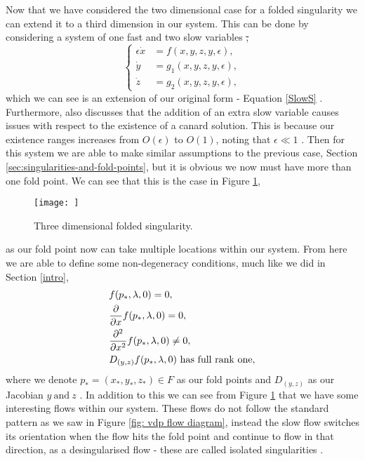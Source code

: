 
Now that we have considered the two dimensional case for a folded singularity we can extend it to a third dimension in our system. This can be done by considering a system of one fast and two slow variables \st, 
\begin{equation}
\begin{cases}
\epsilon \dot{x}&=f(x,y,z,y,\epsilon),\\
\dot{y}&=g_1(x,y,z,y,\epsilon),\\
\dot{z}&=g_2(x,y,z,y,\epsilon),
\end{cases}
\end{equation}
which we can see is an extension of our original form - Equation \ref{SlowS} \citep{MMO}. Furthermore, \citet{MMO} also discusses that the addition of an extra slow variable causes issues with respect to the existence of a canard solution. This is because our existence ranges increases from $ O(\epsilon) $ to $ O(1) $, noting that $ \epsilon\ll 1 $ \citep{MMO}. Then for this system we are able to make similar assumptions to the previous case, Section \ref{sec:singularities-and-fold-points}, but it is obvious we now must have more than one fold point. We can see that this is the case in Figure \ref{fig: 3d folded singularity},
\begin{figure}[h!]\centering
	\texttt{[image: ]}
	\caption{Three dimensional folded singularity.}
	\label{fig: 3d folded singularity}
\end{figure}
as our fold point now can take multiple locations within our system. From here we are able to define some non-degeneracy conditions, much like we did in Section \ref{intro},
\begin{equation}
\begin{aligned}
&f(p_*,\lambda,0)=0,\\
&\pd{}{x}f(p_*,\lambda,0)=0,\\
&\pd{^2}{x^2}f(p_*,\lambda,0)\neq 0,\\
&D_{(y,z)}f(p_*,\lambda,0) \ \text{has full rank one},
\end{aligned}
\label{eq: non-degeneracy 3d system}	
\end{equation}
where we denote $ p_*=(x_*,y_*,z_*)\in F $ as our fold points and $ D_{(y,z)} $ as our Jacobian \wrt $ y \ \text{and}\ z $ \citep{MMO}. In addition to this we can see from Figure \ref{fig: 3d folded singularity} that we have some interesting flows within our system. These flows do not follow the standard pattern as we saw in Figure \ref{fig: vdp flow diagram}, instead the slow flow switches its orientation when the flow hits the fold point and continue to flow in that direction, as a desingularised flow - these are called isolated singularities \citep{MMO}. %
